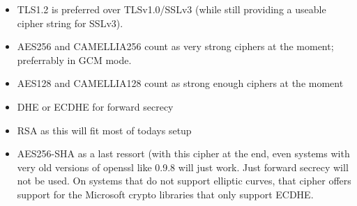 \begin{itemize}
\item TLS1.2 is preferred over TLSv1.0/SSLv3 (while still providing a useable cipher
      string for SSLv3).
\item AES256 and CAMELLIA256 count as very strong ciphers at the moment; preferrably in
      GCM mode.\\
\item AES128 and CAMELLIA128 count as strong enough ciphers at the moment
\item DHE or ECDHE for forward secrecy
\item RSA as this will fit most of todays setup
\item AES256-SHA as a last ressort (with this cipher at the end, even systems with
      very old versions of openssl like 0.9.8 will just work. Just forward secrecy
      will not be used. On systems that do not support elliptic curves, that cipher
      offers support for the Microsoft crypto libraries that only support ECDHE.
\end{itemize}

